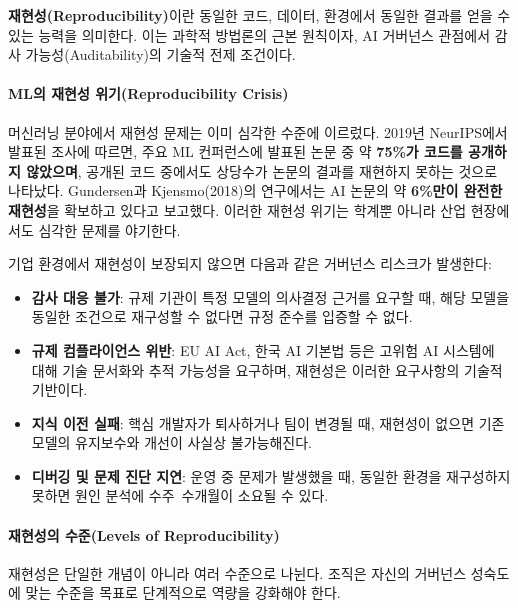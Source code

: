 \textbf{재현성(Reproducibility)}이란 동일한 코드, 데이터, 환경에서 동일한 결과를 얻을 수 있는 능력을 의미한다. 이는 과학적 방법론의 근본 원칙이자, AI 거버넌스 관점에서 감사 가능성(Auditability)의 기술적 전제 조건이다.

\paragraph{ML의 재현성 위기(Reproducibility Crisis)}

머신러닝 분야에서 재현성 문제는 이미 심각한 수준에 이르렀다. 2019년 NeurIPS에서 발표된 조사에 따르면, 주요 ML 컨퍼런스에 발표된 논문 중 약 \textbf{75\%가 코드를 공개하지 않았으며}, 공개된 코드 중에서도 상당수가 논문의 결과를 재현하지 못하는 것으로 나타났다. Gundersen과 Kjensmo(2018)의 연구에서는 AI 논문의 약 \textbf{6\%만이 완전한 재현성}을 확보하고 있다고 보고했다. 이러한 재현성 위기는 학계뿐 아니라 산업 현장에서도 심각한 문제를 야기한다\cite{sculley2015hidden}.

기업 환경에서 재현성이 보장되지 않으면 다음과 같은 거버넌스 리스크가 발생한다:

\begin{itemize}
    \item \textbf{감사 대응 불가}: 규제 기관이 특정 모델의 의사결정 근거를 요구할 때, 해당 모델을 동일한 조건으로 재구성할 수 없다면 규정 준수를 입증할 수 없다.
    \item \textbf{규제 컴플라이언스 위반}: EU AI Act, 한국 AI 기본법 등은 고위험 AI 시스템에 대해 기술 문서화와 추적 가능성을 요구하며, 재현성은 이러한 요구사항의 기술적 기반이다.
    \item \textbf{지식 이전 실패}: 핵심 개발자가 퇴사하거나 팀이 변경될 때, 재현성이 없으면 기존 모델의 유지보수와 개선이 사실상 불가능해진다.
    \item \textbf{디버깅 및 문제 진단 지연}: 운영 중 문제가 발생했을 때, 동일한 환경을 재구성하지 못하면 원인 분석에 수주~수개월이 소요될 수 있다.
\end{itemize}

\paragraph{재현성의 수준(Levels of Reproducibility)}

재현성은 단일한 개념이 아니라 여러 수준으로 나뉜다. 조직은 자신의 거버넌스 성숙도에 맞는 수준을 목표로 단계적으로 역량을 강화해야 한다.

